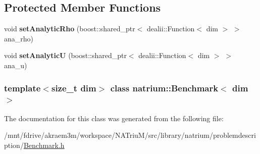 \subsection*{Protected Member Functions}
\begin{DoxyCompactItemize}
\item 
\hypertarget{classnatrium_1_1Benchmark_a8fc5c100f71b53f4fce3e91729dc49c1}{
void {\bfseries setAnalyticRho} (boost::shared\_\-ptr$<$ dealii::Function$<$ dim $>$ $>$ ana\_\-rho)}
\label{classnatrium_1_1Benchmark_a8fc5c100f71b53f4fce3e91729dc49c1}

\item 
\hypertarget{classnatrium_1_1Benchmark_aa57db8a63eca5066c0749ab66186d622}{
void {\bfseries setAnalyticU} (boost::shared\_\-ptr$<$ dealii::Function$<$ dim $>$ $>$ ana\_\-u)}
\label{classnatrium_1_1Benchmark_aa57db8a63eca5066c0749ab66186d622}

\end{DoxyCompactItemize}
\subsubsection*{template$<$size\_\-t dim$>$ class natrium::Benchmark$<$ dim $>$}



The documentation for this class was generated from the following file:\begin{DoxyCompactItemize}
\item 
/mnt/fdrive/akraem3m/workspace/NATriuM/src/library/natrium/problemdescription/\hyperlink{Benchmark_8h}{Benchmark.h}\end{DoxyCompactItemize}
